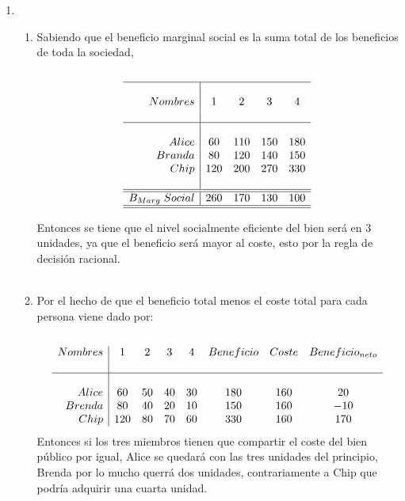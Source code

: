\begin{enumerate}
\begin{enumerate}[\bfseries a.]
    \end{enumerate}

    \item 
	\begin{enumerate}[\bfseries 1.]

	    \item Sabiendo que el beneficio marginal social es la suma total de los beneficios de toda la sociedad, \\\\
		$$\begin{array}{r|cccc}
		    \hline\\
		    Nombres&1&2&3&4\\\\
		    \hline\\
			   Alice&60&110&150&180\\
			   Branda&80&120&140&150\\
			   Chip&120&200&270&330\\\\
			   \hline
			   \hline
		       B_{Marg}\; Social&260&170&130&100\\
		       \hline
		       \hline
		\end{array}$$

		\vspace{.4cm}
	Entonces se tiene que el nivel socialmente eficiente del bien será en 3 unidades, ya que el beneficio será mayor al coste, esto por la regla de decisión racional.\\\\

	    \item Por el hecho de que el beneficio total menos el coste total para cada persona viene dado por:\\\\
		$$\begin{array}{r|ccccccc}
		    Nombres&1&2&3&4&Beneficio&Coste&Beneficio_{neto}\\\\
		    \hline\\
			   Alice&60&50&40&30&180&160&20\\
			   Brenda&80&40&20&10&150&160&-10\\
			   Chip&120&80&70&60&330&160&170\\
		\end{array}$$
		Entonces si los tres miembros tienen que compartir el coste del bien público por igual, Alice se quedará con las tres unidades del principio, Brenda por lo mucho querrá dos unidades, contrariamente a Chip que podría adquirir una cuarta unidad.\\\\

	\end{enumerate}

\end{enumerate}

